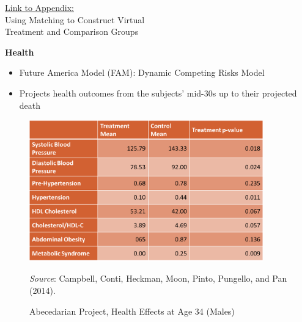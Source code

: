 \documentclass[static]{JJH-Beamer}
\begin{document}
\begin{frame}

\hypertarget{ret:potpie}{}
\begin{center}
\hyperlink{potpie}{\underline{Link to Appendix:}}\\
Using Matching to Construct Virtual \\ Treatment and Comparison Groups
\end{center}

\end{frame}

\begin{frame}

\begin{center}
\textbf{Health}
\end{center}

\begin{itemize}
\item Future America Model (FAM): Dynamic Competing Risks Model
\item Projects health outcomes from the subjects' mid-30s up to their projected death \citep{Goldman_etal_2015_Future-Elderly-Model-Report}
\end{itemize}

\end{frame}


\begin{frame}

\begin{figure}[H]
\caption{Abecedarian Project, Health Effects at Age 34 (Males)}
\begin{center}
\includegraphics[width=0.9\textwidth]{include/ABC-Health-Effects-Age-35.png}
\end{center}
{\flushleft \scriptsize \emph{Source}: Campbell, Conti, Heckman, Moon, Pinto, Pungello, and Pan (2014).\\}
\end{figure}

\end{frame}
\end{document}
